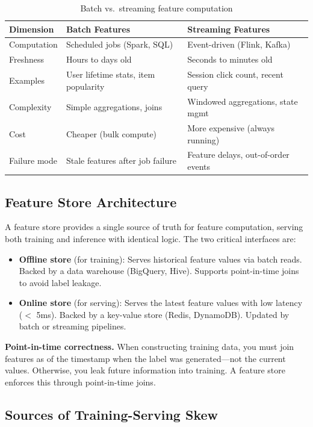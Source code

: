 \begin{table}[H]
\centering
\caption{Batch vs.\ streaming feature computation}
\begin{tabularx}{\textwidth}{lXX}
\toprule
\textbf{Dimension} & \textbf{Batch Features} & \textbf{Streaming Features} \\
\midrule
Computation & Scheduled jobs (Spark, SQL) & Event-driven (Flink, Kafka) \\
Freshness & Hours to days old & Seconds to minutes old \\
Examples & User lifetime stats, item popularity & Session click count, recent query \\
Complexity & Simple aggregations, joins & Windowed aggregations, state mgmt \\
Cost & Cheaper (bulk compute) & More expensive (always running) \\
Failure mode & Stale features after job failure & Feature delays, out-of-order events \\
\bottomrule
\end{tabularx}
\end{table}

\subsection{Feature Store Architecture}

A feature store provides a single source of truth for feature computation, serving both training and inference with identical logic. The two critical interfaces are:

\begin{itemize}
    \item \textbf{Offline store} (for training): Serves historical feature values via batch reads. Backed by a data warehouse (BigQuery, Hive). Supports point-in-time joins to avoid label leakage.
    \item \textbf{Online store} (for serving): Serves the latest feature values with low latency ($<$ 5ms). Backed by a key-value store (Redis, DynamoDB). Updated by batch or streaming pipelines.
\end{itemize}

\textbf{Point-in-time correctness.} When constructing training data, you must join features as of the timestamp when the label was generated---not the current values. Otherwise, you leak future information into training. A feature store enforces this through point-in-time joins.

\subsection{Sources of Training-Serving Skew}

